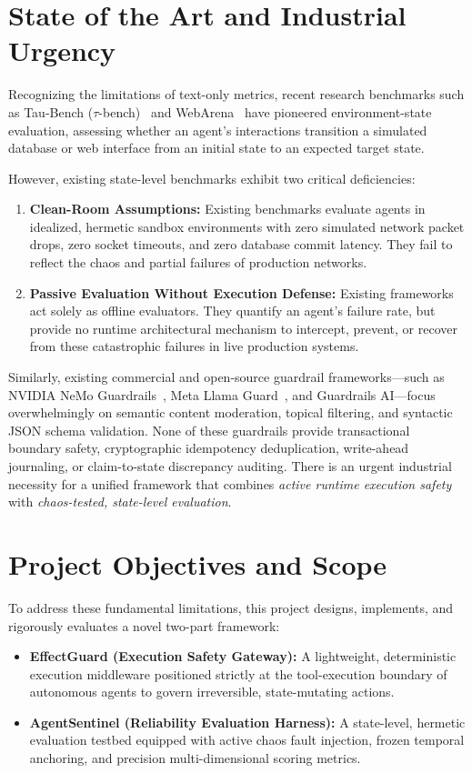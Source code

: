 \section{State of the Art and Industrial Urgency}
\label{sec:intro_urgency}
Recognizing the limitations of text-only metrics, recent research benchmarks such as Tau-Bench ($\tau$-bench)~\cite{yao2024taubench} and WebArena~\cite{zhou2023webarena} have pioneered environment-state evaluation, assessing whether an agent's interactions transition a simulated database or web interface from an initial state to an expected target state. 

However, existing state-level benchmarks exhibit two critical deficiencies:
\begin{enumerate}
    \item \textbf{Clean-Room Assumptions:} Existing benchmarks evaluate agents in idealized, hermetic sandbox environments with zero simulated network packet drops, zero socket timeouts, and zero database commit latency. They fail to reflect the chaos and partial failures of production networks.
    \item \textbf{Passive Evaluation Without Execution Defense:} Existing frameworks act solely as offline evaluators. They quantify an agent's failure rate, but provide no runtime architectural mechanism to intercept, prevent, or recover from these catastrophic failures in live production systems.
\end{enumerate}

Similarly, existing commercial and open-source guardrail frameworks—such as NVIDIA NeMo Guardrails~\cite{rebedea2023nemo}, Meta Llama Guard~\cite{inan2023llama}, and Guardrails AI—focus overwhelmingly on semantic content moderation, topical filtering, and syntactic JSON schema validation. None of these guardrails provide transactional boundary safety, cryptographic idempotency deduplication, write-ahead journaling, or claim-to-state discrepancy auditing. There is an urgent industrial necessity for a unified framework that combines \textit{active runtime execution safety} with \textit{chaos-tested, state-level evaluation}.

\section{Project Objectives and Scope}
\label{sec:intro_objectives}
To address these fundamental limitations, this project designs, implements, and rigorously evaluates a novel two-part framework:
\begin{itemize}
    \item \textbf{EffectGuard (Execution Safety Gateway):} A lightweight, deterministic execution middleware positioned strictly at the tool-execution boundary of autonomous agents to govern irreversible, state-mutating actions.
    \item \textbf{AgentSentinel (Reliability Evaluation Harness):} A state-level, hermetic evaluation testbed equipped with active chaos fault injection, frozen temporal anchoring, and precision multi-dimensional scoring metrics.
\end{itemize}

